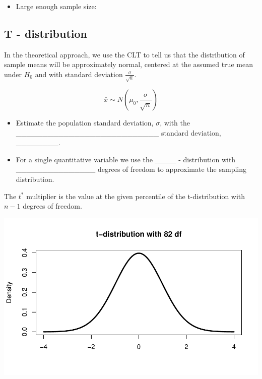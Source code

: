 \documentclass[
]{report}
\providecommand{\tightlist}{%
  \setlength{\itemsep}{0pt}\setlength{\parskip}{0pt}}
\begin{document}
\vspace{0.2in}

\begin{itemize}
\tightlist
\item
  Large enough sample size:
\end{itemize}

\vspace{0.2in}

\subsection*{T - distribution}\label{t---distribution}

In the theoretical approach, we use the CLT to tell us that the distribution of sample means will be approximately normal, centered at the assumed true mean under \(H_0\) and with standard deviation \(\frac{\sigma}{\sqrt{n}}\).

\[\bar{x} \sim N(\mu_0, \frac{\sigma}{\sqrt{n}})\]

\begin{itemize}
\item
  Estimate the population standard deviation, \(\sigma\), with the
  \_\_\_\_\_\_\_\_\_\_\_\_\_\_\_\_\_\_\_\_\_\_\_\_\_\_\_ standard deviation, \_\_\_\_\_\_\_\_.
\item
  For a single quantitative variable we use the \_\_\_\_ - distribution
  with \_\_\_\_\_\_\_\_\_\_\_\_\_\_\_
  degrees of freedom to approximate the sampling distribution.
\end{itemize}


The \(t^*\) multiplier is the value at the given percentile of the t-distribution with \(n - 1\) degrees of freedom.

\begin{center}\includegraphics[width=0.7\linewidth]{06-VN06-EDAonemeanSim_files/figure-latex/tstarpb-1} \end{center}
\end{document}
